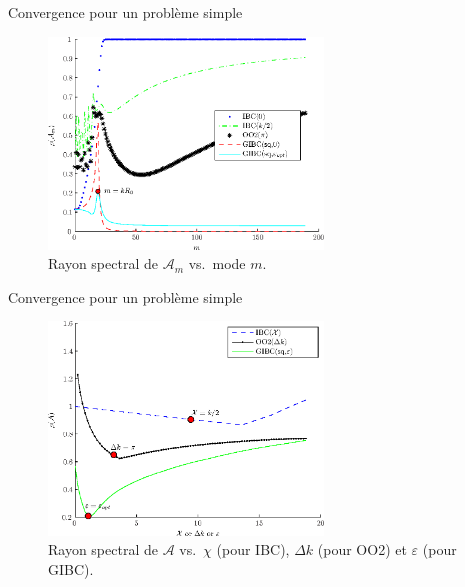 \documentclass[
mode=present,    %
paper=a4paper,   %
orient=landscape,
display=slides,   %
size=10pt,
style=romain   %
]{powerdot}
\begin{document}
\begin{slide}[toc=]{Convergence pour un problème simple}

\begin{figure}
  \begin{center}
    \includegraphics[width=0.65\textwidth]{RadiusModebyMode-final}
    \caption{Rayon spectral de $\mathcal{A}_{m}$ vs.\ mode $m$. \label{radiusMode}}
  \end{center}
  \label{MinimizationRadius}
\end{figure}

\end{slide}

\begin{slide}[toc=]{Convergence pour un problème simple}

\begin{figure}
  \begin{center}
    \includegraphics[width=0.65\textwidth]{RadiusMinimization-final}
  \end{center}
  \caption{Rayon spectral de $\mathcal{A}$ vs.\ $\chi$ (pour IBC), 
  $\Delta k$ (pour OO2) et $\varepsilon$ (pour GIBC).
 \label{RadiusMini}}
\end{figure}

\end{slide}
\end{document}
